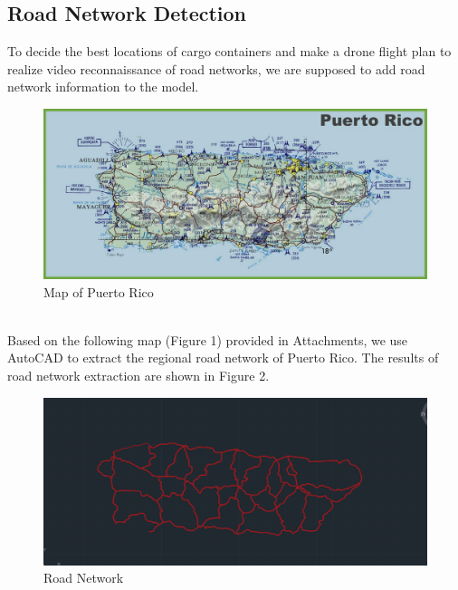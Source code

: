 \documentclass{mcmthesis}
\begin{document}
\subsection{Road Network Detection}
To decide the best locations of cargo containers and make a drone flight plan to realize video reconnaissance of road networks, we are supposed to add road network information to the model.     
\begin{figure}[h]
	\small
	\centering
	\includegraphics[width=15cm]{1.jpg}
	\caption{Map of Puerto Rico} \label{fig:Map of Puerto Rico}
\end{figure}\\
Based on the following map (Figure 1) provided in Attachments, we use AutoCAD to extract the regional road network of Puerto Rico. The results of road network extraction are shown in Figure 2. 
\begin{figure}[h]
	\small
	\centering
	\includegraphics[width=15cm]{8.png}
	\caption{Road Network} \label{fig:2}
\end{figure}\\
\end{document}
